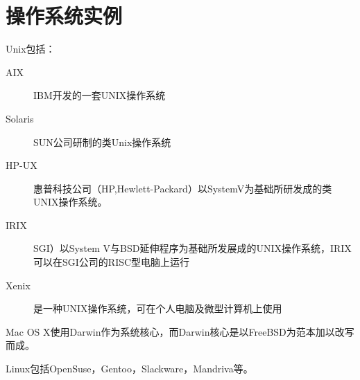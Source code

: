 \section{操作系统实例}

Unix包括：
\begin{description}
\item [AIX] IBM开发的一套UNIX操作系统
\item [Solaris] SUN公司研制的类Unix操作系统
\item [HP-UX] 惠普科技公司（HP,Hewlett-Packard）以SystemV为基础所研发成的类UNIX操作系统。
\item [IRIX] SGI）以System V与BSD延伸程序为基础所发展成的UNIX操作系统，IRIX可以在SGI公司的RISC型电脑上运行
\item [Xenix] 是一种UNIX操作系统，可在个人电脑及微型计算机上使用
\end{description}

Mac OS X使用Darwin作为系统核心，而Darwin核心是以FreeBSD为范本加以改写而成。

Linux包括OpenSuse，Gentoo，Slackware，Mandriva等。



